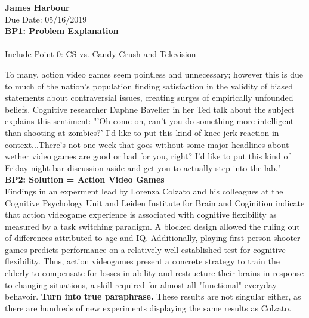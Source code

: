 \documentclass[a4paper, 12pt]{article}
\begin{document}
\noindent
\textbf{James Harbour} \\
\normalsize   Due Date: 05/16/2019 \\

\large\textbf{BP1: Problem Explanation}
\normalsize \\ \\
Include Point 0: CS vs. Candy Crush and Television

To many, action video games seem pointless and unnecessary; however this is due to much of the nation's population finding satisfaction in the validity of biased statements about contraversial issues, creating surges of empirically unfounded beliefs. Cognitive researcher Daphne Bavelier in her Ted talk about the subject explains this sentiment: "'Oh come on, can't you do something more intelligent than shooting at zombies?' I'd like to put this kind of knee-jerk reaction in context...There's not one week that goes without some major headlines about wether video games are good or bad for you, right? I'd like to put this kind of Friday night bar discussion aside and get you to actually step into the lab."
\\

\large\textbf{BP2: Solution = Action Video Games}
\normalsize \\

Findings in an experment lead by Lorenza Colzato and his colleagues at the Cognitive Psychology Unit and Leiden Institute for Brain and Coginition indicate that action videogame experience is associated with cognitive flexibility as measured by a task switching paradigm. A blocked design allowed the ruling out of differences attributed to age and IQ. Additionally, playing first-person shooter games predicts performance on a relatively well established test for cognitive flexibility. Thus, action videogames present a concrete strategy to train the elderly to compensate for losses in ability and restructure their brains in response to changing situations, a skill required for almost all "functional" everyday behavoir. \textbf{Turn into true paraphrase.} These results are not singular either, as there are hundreds of new experiments displaying the same results as Colzato. 
\end{document}
